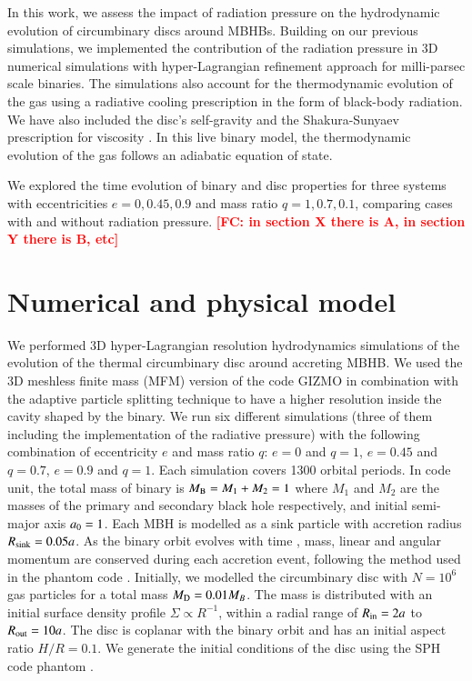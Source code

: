 \documentclass{aa}
\newcommand{\fc}[1]{\textcolor{red}{\bf [FC: #1]}}
\begin{document}
In this work, we assess the impact of radiation pressure on the hydrodynamic evolution of circumbinary discs around MBHBs. Building on our previous simulations, we implemented the contribution of the radiation pressure in 3D numerical simulations with hyper-Lagrangian refinement approach for milli-parsec scale binaries. The simulations also account for the thermodynamic evolution of the gas using a radiative cooling prescription in the form of black-body radiation. We have also included the disc's self-gravity and the Shakura-Sunyaev prescription for viscosity \citep{ShakuraSunyaev1973}. 
In this live binary model, the thermodynamic evolution of the gas follows an adiabatic equation of state.

We explored the time evolution of binary and disc properties for three systems with eccentricities $e=0, 0.45, 0.9$ and mass ratio $q=1, 0.7, 0.1$, comparing cases with and without radiation pressure.
\fc{in section X there is A, in section Y there is B, etc}






\section{Numerical and physical model} 

We performed 3D hyper-Lagrangian resolution hydrodynamics simulations of the evolution of the thermal circumbinary disc around accreting MBHB. We used the 3D meshless finite mass (MFM) version of the code \textsc{GIZMO} \citep{Hopkins2015} in combination with the adaptive particle splitting technique \citep[see][for details]{Franchini2022} to have a higher resolution inside the cavity shaped by the binary. We run six different simulations (three of them including the implementation of the radiative pressure) with the following combination of eccentricity $e$ and mass ratio $q$: $e=0$ and $q=1$, $e=0.45$ and $q=0.7$, $e=0.9$ and $q=1$. Each simulation covers 1300 orbital periods. In code unit, the total mass of binary is $M_{\rm B} = M_{\rm 1} + M_{\rm 2} = 1$ where $M_{1}$ and $M_{2}$ are the masses of the primary and secondary black hole respectively, and initial semi-major axis $a_{\rm 0}=1$. Each MBH is modelled as a sink particle with accretion radius $R_{\rm sink} = 0.05a$. As the binary orbit evolves with time \citep{Franchini2023}, mass, linear and angular momentum are conserved during each accretion event, following the method used in the {\sc phantom} code \citep{bate1995}.
Initially, we modelled the circumbinary disc with $N=10^6$ gas particles for a total mass $M_{\rm D} = 0.01 M_{B}$. The mass is distributed with an initial surface density profile $\Sigma \propto R^{-1}$, within a radial range of $R_{\rm in}=2a$ to $R_{\rm out}=10a$. The disc is coplanar with the binary orbit and has an initial aspect ratio $H/R = 0.1$. We generate the initial conditions of the disc using the SPH code {\sc phantom} \citep{Price2017}.
\end{document}
